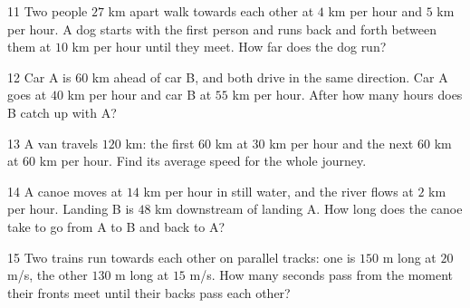\gap
\begin{probbox}{11}{}
Two people $27$ km apart walk towards each other at $4$ km per hour and $5$ km per hour. A dog starts with the first person and runs back and forth between them at $10$ km per hour until they meet. How far does the dog run?
\end{probbox}
\gap
\begin{probbox}{12}{\relax}
Car A is $60$ km ahead of car B, and both drive in the same direction. Car A goes at $40$ km per hour and car B at $55$ km per hour. After how many hours does B catch up with A?
\end{probbox}
\gap
\begin{probbox}{13}{}
A van travels $120$ km: the first $60$ km at $30$ km per hour and the next $60$ km at $60$ km per hour. Find its average speed for the whole journey.
\end{probbox}
\gap
\begin{probbox}{14}{\relax}
A canoe moves at $14$ km per hour in still water, and the river flows at $2$ km per hour. Landing B is $48$ km downstream of landing A. How long does the canoe take to go from A to B and back to A?
\end{probbox}
\gap
\begin{probbox}{15}{\relax}
Two trains run towards each other on parallel tracks: one is $150$ m long at $20$ m/s, the other $130$ m long at $15$ m/s. How many seconds pass from the moment their fronts meet until their backs pass each other?
\end{probbox}
